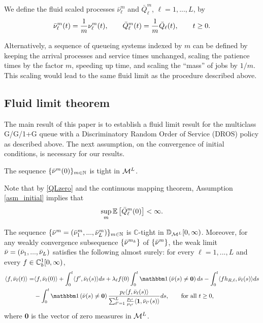 \documentclass{article}
\numberwithin{equation}{section}
\begin{document}
We define the fluid scaled processes $\bar\nu^m_\ell$ and  $\bar Q_\ell^m$, $\ell=1,...,L$, by
\[
    \bar\nu^m_\ell(t)=\frac{1}{m}\nu^m_\ell(t),\quad\quad \bar {Q}^m_\ell(t)=\frac{1}{m}\bar {Q}_\ell(t),\quad\quad t\geq0.
\]


\begin{remark}
 Alternatively, a sequence of queueing systems indexed by $m$ can be defined by keeping the arrival processes and service times unchanged, scaling the patience times by the factor $m$, speeding up time, and scaling the ``mass'' of jobs by $1/m$. This scaling would lead to the same fluid limit as the procedure described above.
\end{remark}

\subsection{Fluid limit theorem}

The main result of this paper is to establish a fluid limit 
result %
for the multiclass G/G/1+G queue with a Discriminatory Random Order of Service (DROS) policy as described above. The next assumption, on the convergence of initial conditions, is necessary for our results. 

\begin{assumption}\label{asm_initial}
The sequence $\{\bar{\nu}^m(0)\}_{m\in\mathbb{N}}$ is tight in $\mathcal{M}^L$.
\end{assumption}
Note that by \eqref{QLzero} and the continuous mapping theorem, Assumption \ref{asm_initial} implies that
\begin{equation}\label{Q0_bound}
\sup_m \mathbb{E}\left[\bar {Q}^m_\ell(0)\right]<\infty.
\end{equation}




\begin{theorem}\label{thm_conv}
The sequence $\{\bar{\nu}^m=(\bar{\nu}_1^m,...,\bar{\nu}_L^m)\}_{m\in\mathbb{N}}$ is $\mathbb{C}$-tight in $\mathbb{D}_{\mathcal{M}^L}[0,\infty)$. Moreover, for any weakly convergence subsequence 
$\{\bar{\nu}^{m_k}\}$ of $\{\bar{\nu}^m\}$, the weak limit  $\bar{\nu}=(\bar{\nu}_1,...,\bar{\nu}_L)$ satisfies the following almost surely: for every $\ell=1,...,L$ and every $f\in\mathbb{C}_b^{1}[0,\infty)$,
\begin{align}\label{fluid_eq}
  \langle f,\bnu_\ell(t)\rangle  = & \langle f,\bnu_\ell(0)\rangle + \int_0^t\langle f' ,\bnu_\ell(s)\rangle ds +\lambda_\ell f(0)\int_0^t\indic{\bar\nu(s)\neq\mathbf{0}}ds - \int_0^t\langle fh_{R,\ell},\bnu_\ell(s)\rangle ds \\
  &- \int_0^t\indic{\bar\nu(s)\neq \mathbf{0}}\frac{\weight_\ell\langle f,\bnu_\ell(s)\rangle}{\sum_{\ell'=1}^{L}\frac{\weight_{\ell'}}{\mu_{\ell'}}\langle\f1,\bnu_{\ell'}(s)\rangle} ds,\notag\quad\quad \text{for all }t\geq0,
\end{align}
where $\mathbf{0}$ is the vector of zero measures in $\mathcal{M}^L$.
\end{theorem}
\end{document}
